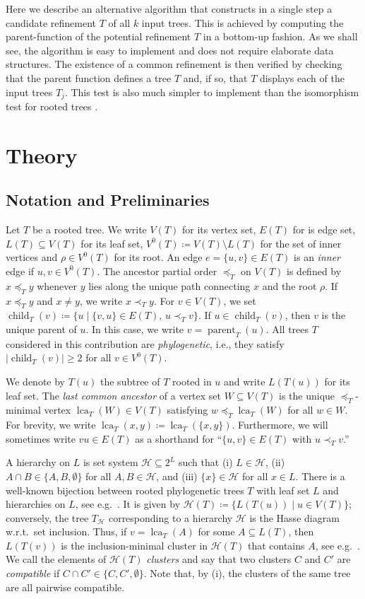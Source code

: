 \documentclass[11pt]{article}
\newcommand{\lca}{\operatorname{lca}}
\newcommand{\parent}{\operatorname{parent}}
\newcommand{\child}{\operatorname{child}}
\newcommand{\HH}{\mathcal{H}}
\begin{document}
Here we describe an alternative algorithm that constructs in a single step
a candidate refinement $T$ of all $k$ input trees. This is achieved by
computing the parent-function of the potential refinement $T$ in a
bottom-up fashion. As we shall see, the algorithm is easy to implement and
does not require elaborate data structures. The existence of a common
refinement is then verified by checking that the parent function defines a
tree $T$ and, if so, that $T$ displays each of the input trees $T_j$. This
test is also much simpler to implement than the isomorphism test for rooted
trees \cite{Aho:74}. 


\section*{Theory}

\subsection*{Notation and Preliminaries}

Let $T$ be a rooted tree. We write $V(T)$ for its vertex set, $E(T)$ for is
edge set, $L(T)\subseteq V(T)$ for its leaf set,
$V^0(T)\coloneqq V(T)\setminus L(T)$ for the set of inner vertices and
$\rho\in V^0(T)$ for its root. An edge $e=\{u,v\}\in E(T)$ is an
\emph{inner} edge if $u,v\in V^0(T)$.  The ancestor partial order
$\preceq_T$ on $V(T)$ is defined by $x\preceq_T y$ whenever $y$ lies along
the unique path connecting $x$ and the root $\rho$. If $x\preceq_T y$ and
$x\ne y$, we write $x \prec_T y$.  For $v\in V(T)$, we set
$\child_T(v)\coloneqq\{u\mid\{v,u\}\in E(T),\, u\prec_T v\}$. If
$u\in\child_T(v)$, then $v$ is the unique parent of $u$. In this case, we write
$v=\parent_T(u)$. All trees $T$ considered in this contribution are
\emph{phylogenetic}, i.e., they satisfy $|\child_T(v)|\ge 2$ for all
$v\in V^0(T)$.

We denote by $T(u)$ the subtree of $T$ rooted in $u$ and write $L(T(u))$
for its leaf set. The \emph{last common ancestor} of a vertex set
$W\subseteq V(T)$ is the unique $\preceq_T$-minimal vertex
$\lca_T(W)\in V(T)$ satisfying $w\preceq_T\lca_T(W)$ for all $w\in W$. For
brevity, we write $\lca_T(x,y)\coloneqq\lca_T(\{x,y\})$. Furthermore, we
will sometimes write $vu\in E(T)$ as a shorthand for ``$\{u,v\}\in E(T)$
with $u\prec_T v$.'' 

A hierarchy on $L$ is set system $\HH\subseteq 2^L$ such that (i)
$L\in\HH$, (ii) $A\cap B\in\{A,B,\emptyset\}$ for all $A,B\in\HH$, and
(iii) $\{x\}\in\HH$ for all $x\in L$. There is a well-known bijection
between rooted phylogenetic trees $T$ with leaf set $L$ and hierarchies on
$L$, see e.g.\ \cite[Thm.\ 3.5.2]{Semple:03}. It is given by
$\HH(T) \coloneqq \{ L(T(u)) \mid u\in V(T) \}$; conversely, the tree
$T_{\HH}$ corresponding to a hierarchy $\HH$ is the Hasse diagram w.r.t.\
set inclusion. Thus, if $v=\lca_T(A)$ for some $A\subseteq L(T)$, then
$L(T(v))$ is the inclusion-minimal cluster in $\HH(T)$ that contains $A$,
see e.g.\ \cite{Hellmuth:21q}.  We call the elements of $\HH(T)$
\emph{clusters} and say that two clusters $C$ and $C'$ are
\emph{compatible} if $C\cap C'\in\{C,C',\emptyset\}$.  Note that, by (i),
the clusters of the same tree are all pairwise compatible.
\end{document}

